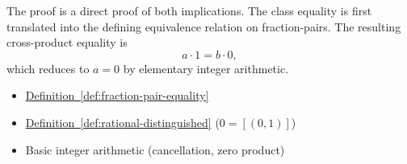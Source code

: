 \begin{remark*}
The proof is a direct proof of both implications. The class equality is
first translated into the defining equivalence relation on fraction-pairs.
The resulting cross-product equality is
\[
a\cdot 1=b\cdot 0,
\]
which reduces to $a=0$ by elementary integer arithmetic.
\end{remark*}

\begin{dependencies}
\begin{itemize}
  \item \hyperref[def:fraction-pair-equality]{Definition~\ref*{def:fraction-pair-equality}}
  \item \hyperref[def:rational-distinguished]{Definition~\ref*{def:rational-distinguished}}
        \textnormal{($0 = [(0,1)]$)}
  \item Basic integer arithmetic (cancellation, zero product)
\end{itemize}
\end{dependencies}
